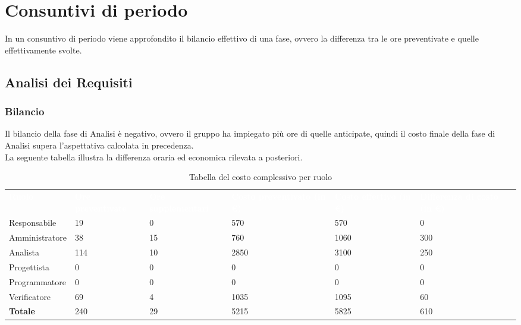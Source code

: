 \section{Consuntivi di periodo}
In un consuntivo di periodo viene approfondito il bilancio effettivo di una fase, ovvero la differenza tra le ore preventivate e quelle effettivamente svolte.

\subsection{Analisi dei Requisiti}
\subsubsection{Bilancio}
Il bilancio della fase di Analisi è negativo, ovvero il gruppo ha impiegato più ore di quelle anticipate, quindi il costo finale della fase di Analisi supera l'aspettativa calcolata in precedenza.\\
La seguente tabella illustra la differenza oraria ed economica rilevata a posteriori.

{
\renewcommand{\arraystretch}{2}
\begin{longtable}[h]{ C{2.5cm} C{2.5cm} C{2.5cm} C{2.5cm} C{1.5cm} C{2.5cm}}
\caption{Tabella del costo complessivo per ruolo}\\

\textcolor{white}{\textbf{Ruolo}} & 
\textcolor{white}{\textbf{Ore preventivate}} & 
\textcolor{white}{\textbf{Ore supplementari}} & 
\textcolor{white}{\textbf{Costo preventivato (in \euro{})}} & 
\textcolor{white}{\textbf{Costo effettivo (in \euro{})}} & 
\textcolor{white}{\textbf{Differenza di costo (in \euro{})}}\\	
	
Responsabile    &  19 &  0 &  570 &  570 &   0 \\
Amministratore  &  38 & 15 &  760 & 1060 & 300 \\
Analista        & 114 & 10 & 2850 & 3100 & 250 \\
Progettista     &   0 &  0 &    0 &    0 &   0 \\
Programmatore   &   0 &  0 &    0 &    0 &   0 \\
Verificatore    &  69 &  4 & 1035 & 1095 &  60 \\
\textbf{Totale} & 240 & 29 & 5215 & 5825 & 610 \\	

\end{longtable}
}

